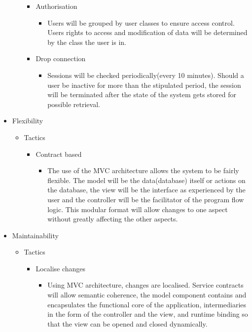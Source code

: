 \documentclass[a4paper,12pt]{article}
\begin{document}
\begin{itemize}
\begin{itemize}
\begin{itemize}
				\item Authorisation
						\begin{itemize}
							\item Users will be grouped by user classes to ensure access control. Users rights to access and modification of data will be determined by the class the user is in.
						\end{itemize}		
					
					
				\item Drop connection
					\begin{itemize}
						\item Sessions will be checked periodically(every 10 minutes). Should a user be inactive for more than the stipulated period, the session will be terminated after the state of the system gets stored for possible retrieval.
					\end{itemize}		
							
				
				
			\end{itemize}			
			
		\end{itemize}
		\item Flexibility
		\begin{itemize}
			
			\item Tactics
			\begin{itemize}
				
				\item Contract based
					\begin{itemize}
						\item The use of the MVC architecture allows the system to be fairly flexible. The model will be the data(database) itself or actions on the database, the view will be the interface as experienced by the user and the controller will be the facilitator of the program flow logic. This modular format will allow changes to one aspect without greatly affecting the other aspects.
					\end{itemize}

			\end{itemize}			
			
		\end{itemize}
		\item Maintainability
		\begin{itemize}
			
			\item Tactics
			\begin{itemize}
				\item Localise changes
					\begin{itemize}
						\item Using MVC architecture, changes are localised. Service contracts will allow semantic coherence, the model component contains and encapsulates the functional core of the application, intermediaries in the form of the controller and the view, and runtime binding so that the view can be opened and closed dynamically.
					\end{itemize}
					

\end{itemize}
\end{itemize}
\end{itemize}
\end{document}
